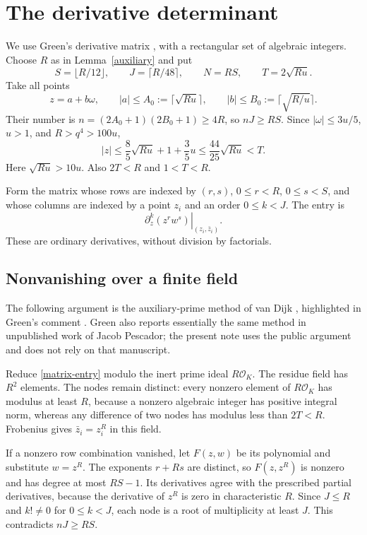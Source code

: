 \documentclass[11pt]{article}
\newcommand{\OK}{\mathcal O_K}
\begin{document}
\section{The derivative determinant}\label{determinant}

We use Green's derivative matrix \cite[\S2]{green}, with a
rectangular set of algebraic integers. Choose \(R\) as in
Lemma~\ref{auxiliary} and put
\[
 S=\lfloor R/12\rfloor,\qquad J=\lceil R/48\rceil,\qquad
 N=RS,\qquad T=2\sqrt{Ru}.
\]
Take all points
\[
 z=a+b\omega,\qquad
 |a|\le A_0:=\lceil\sqrt{Ru}\rceil,\qquad
 |b|\le B_0:=\lceil\sqrt{R/u}\rceil.
\]
Their number is \(n=(2A_0+1)(2B_0+1)\ge4R\), so \(nJ\ge RS\).
Since \(|\omega|\le3u/5\), \(u>1\), and \(R>q^4>100u\),
\[
 |z|\le\frac85\sqrt{Ru}+1+\frac35u
       \le\frac{44}{25}\sqrt{Ru}<T.
\]
Here \(\sqrt{Ru}>10u\). Also \(2T<R\) and \(1<T<R\).

Form the matrix whose rows are indexed by \((r,s)\),
\(0\le r<R\), \(0\le s<S\), and whose columns are indexed by a
point \(z_i\) and an order \(0\le k<J\). The entry is
\begin{equation}\label{matrix-entry}
 \left.\partial_z^k(z^r w^s)\right|_{(z_i,\bar z_i)}.
\end{equation}
These are ordinary derivatives, without division by factorials.

\subsection{Nonvanishing over a finite field}

The following argument is the auxiliary-prime method of van Dijk
\cite{vandijk}, highlighted in Green's comment \cite{greencomment}.
Green also reports essentially the same method in unpublished work
of Jacob Pescador; the present note uses the public argument and does
not rely on that manuscript.

Reduce \eqref{matrix-entry} modulo the inert prime ideal \(R\OK\).
The residue field has \(R^2\) elements. The nodes remain distinct:
every nonzero element of \(R\OK\) has modulus at least \(R\),
because a nonzero algebraic integer has positive integral norm,
whereas any difference of two nodes has modulus less than \(2T<R\).
Frobenius gives \(\bar z_i=z_i^R\) in this field.

If a nonzero row combination vanished, let \(F(z,w)\) be its
polynomial and substitute \(w=z^R\). The exponents \(r+Rs\) are
distinct, so \(F(z,z^R)\) is nonzero and has degree at most \(RS-1\).
Its derivatives agree with the prescribed partial derivatives,
because the derivative of \(z^R\) is zero in characteristic \(R\).
Since \(J\le R\) and \(k!\ne0\) for \(0\le k<J\), each node is
a root of multiplicity at least \(J\). This contradicts \(nJ\ge RS\).
\end{document}

